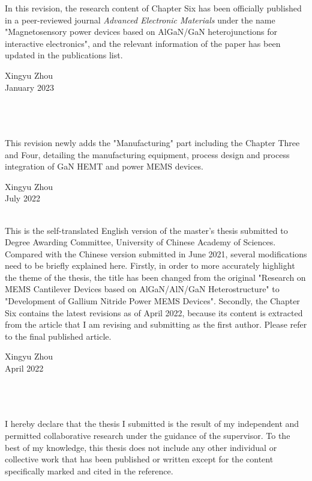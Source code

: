 
\begin{declaration}

In this revision, the research content of Chapter Six has been officially published in a peer-reviewed journal \textit{Advanced Electronic Materials} under the name "Magnetosensory power devices based on AlGaN/GaN heterojunctions for interactive electronics", and the relevant information of the paper has been updated in the publications list.
\begin{flushright}
	Xingyu Zhou \\
	January 2023
\end{flushright}

~\\
~\\
~\\


\noindent This revision newly adds the "Manufacturing" part including the Chapter Three and Four, detailing the manufacturing equipment, process design and process integration of GaN HEMT and power MEMS devices.
\begin{flushright}
	Xingyu Zhou \\
	July 2022
\end{flushright}

\clearpage

~\\


\noindent This is the self-translated English version of the master's thesis submitted to Degree Awarding Committee, University of Chinese Academy of Sciences. Compared with the Chinese version submitted in June 2021, several modifications need to be briefly explained here. Firstly, in order to more accurately highlight the theme of the thesis, the title has been changed from the original "Research on MEMS Cantilever Devices based on AlGaN/AlN/GaN Heterostructure" to "Development of Gallium Nitride Power MEMS Devices". Secondly, the Chapter Six contains the latest revisions as of April 2022, because its content is extracted from the article that I am revising and submitting as the first author. Please refer to the final published article.
\begin{flushright}
	Xingyu Zhou \\
	April 2022
\end{flushright}

~\\
~\\
~\\
 
\noindent I hereby declare that the thesis I submitted is the result of my independent and permitted collaborative research under the guidance of the supervisor. To the best of my knowledge, this thesis does not include any other individual or collective work that has been published or written except for the content specifically marked and cited in the reference.


\end{declaration}

